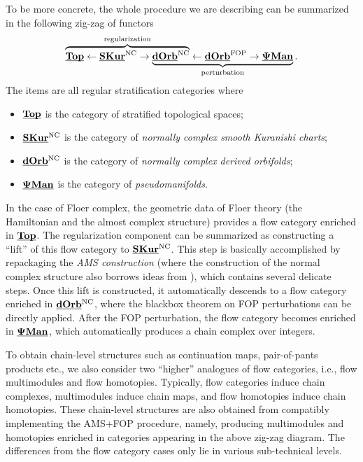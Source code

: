 \documentclass[reqno, 10pt]{amsart}
\numberwithin{equation}{section}
\numberwithin{equation}{section}
\theoremstyle{definition}
\theoremstyle{remark}
\newcommand{\beqn}{\begin{equation*}}
\newcommand{\eeqn}{\end{equation*}}
\newcommand{\pman}{\uds{{\bf \Psi}{\bf Man}}}
\newcommand{\uds}[1]{\underline{\smash{#1}}}
\begin{document}
To be more concrete, the whole procedure we are describing can be summarized in the following zig-zag of functors
\beqn
\rlap{$\overbrace{\phantom{ \uds{\bf Top} \leftarrow \uds{\bf Kur}_{\rm finite}^{\rm NC} \rightarrow \uds{\bf dOrb}^{\rm NC}} }^{{\rm regularization}}$} \uds{\bf Top} \leftarrow \uds{\bf SKur}^{\rm NC} \rightarrow  \underbrace{\uds{\bf dOrb}^{\rm NC} \leftarrow \uds{\bf dOrb}^{\rm FOP} \rightarrow \pman}_{\rm perturbation}.
\eeqn
The items are all regular stratification categories where
\begin{itemize}

\item $\uds{\bf Top}$ is the category of stratified topological spaces;

\item $\uds{\bf SKur}^{\rm NC}$ is the category of {\it normally complex smooth Kuranishi charts};

\item $\uds{\bf dOrb}^{{\rm NC}}$ is the category of {\it normally complex derived orbifolds};

\item $\pman$ is the category of {\it pseudomanifolds}.
\end{itemize}
In the case of Floer complex, the geometric data of Floer theory (the Hamiltonian and the almost complex structure) provides a flow category enriched in $\uds{\bf Top}$. The regularization component can be summarized as constructing a ``lift'' of this flow category to $\uds{\bf SKur}^{\rm NC}$. This step is basically accomplished by repackaging the {\it AMS construction} \cite{AMS, AMS2} (where the construction of the normal complex structure also borrows ideas from \cite{Abouzaid_Blumberg_2024}), which contains several delicate steps. Once this lift is constructed, it automatically descends to a flow category enriched in $\uds{\bf dOrb}^{\rm NC}$, where the blackbox theorem on FOP perturbations can be directly applied. After the FOP perturbation, the flow category becomes enriched in $\pman$, which automatically produces a chain complex over integers.

To obtain chain-level structures such as continuation maps, pair-of-pants products etc., we also consider two ``higher'' analogues of flow categories, i.e., flow multimodules and flow homotopies. Typically, flow categories induce chain complexes, multimodules induce chain maps, and flow homotopies induce chain homotopies. These chain-level structures are also obtained from compatibly implementing the AMS+FOP procedure, namely, producing multimodules and homotopies enriched in categories appearing in the above zig-zag diagram. The differences from the flow category cases only lie in various sub-technical levels.
\end{document}
